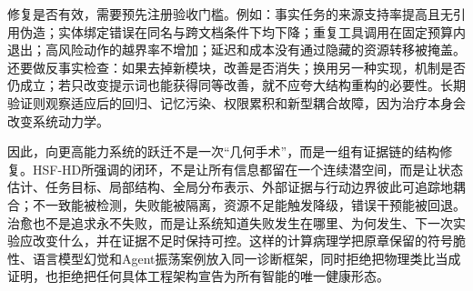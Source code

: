 修复是否有效，需要预先注册验收门槛。例如：事实任务的来源支持率提高且无引用伪造；实体绑定错误在同名与跨文档条件下均下降；重复工具调用在固定预算内退出；高风险动作的越界率不增加；延迟和成本没有通过隐藏的资源转移被掩盖。还要做反事实检查：如果去掉新模块，改善是否消失；换用另一种实现，机制是否仍成立；若只改变提示词也能获得同等改善，就不应夸大结构重构的必要性。长期验证则观察适应后的回归、记忆污染、权限累积和新型耦合故障，因为治疗本身会改变系统动力学。

因此，向更高能力系统的跃迁不是一次“几何手术”，而是一组有证据链的结构修复。HSF-HD所强调的闭环，不是让所有信息都留在一个连续潜空间，而是让状态估计、任务目标、局部结构、全局分布表示、外部证据与行动边界彼此可追踪地耦合；不一致能被检测，失败能被隔离，资源不足能触发降级，错误干预能被回退。治愈也不是追求永不失败，而是让系统知道失败发生在哪里、为何发生、下一次实验应改变什么，并在证据不足时保持可控。这样的计算病理学把原章保留的符号脆性、语言模型幻觉和Agent振荡案例放入同一诊断框架，同时拒绝把物理类比当成证明，也拒绝把任何具体工程架构宣告为所有智能的唯一健康形态。
